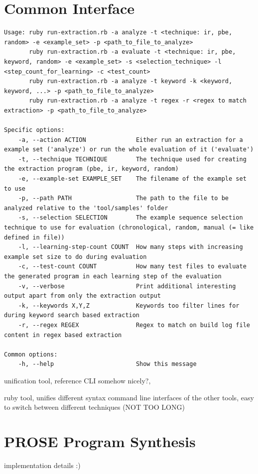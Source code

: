 \documentclass[\myrootdir/main.tex]{subfiles}
\begin{document}
\section{Common Interface}
\begin{lstlisting}
Usage: ruby run-extraction.rb -a analyze -t <technique: ir, pbe, random> -e <example_set> -p <path_to_file_to_analyze>
       ruby run-extraction.rb -a evaluate -t <technique: ir, pbe, keyword, random> -e <example_set> -s <selection_technique> -l <step_count_for_learning> -c <test_count>
       ruby run-extraction.rb -a analyze -t keyword -k <keyword, keyword, ...> -p <path_to_file_to_analyze>
       ruby run-extraction.rb -a analyze -t regex -r <regex to match extraction> -p <path_to_file_to_analyze>

Specific options:
    -a, --action ACTION              Either run an extraction for a example set ('analyze') or run the whole evaluation of it ('evaluate')
    -t, --technique TECHNIQUE        The technique used for creating the extraction program (pbe, ir, keyword, random)
    -e, --example-set EXAMPLE_SET    The filename of the example set to use
    -p, --path PATH                  The path to the file to be analyzed relative to the 'tool/samples' folder
    -s, --selection SELECTION        The example sequence selection technique to use for evaluation (chronological, random, manual (= like defined in file))
    -l, --learning-step-count COUNT  How many steps with increasing example set size to do during evaluation
    -c, --test-count COUNT           How many test files to evaluate the generated program in each learning step of the evaluation
    -v, --verbose                    Print additional interesting output apart from only the extraction output
    -k, --keywords X,Y,Z             Keywords too filter lines for during keyword search based extraction
    -r, --regex REGEX                Regex to match on build log file content in regex based extraction

Common options:
    -h, --help                       Show this message
\end{lstlisting}
unification tool, reference CLI somehow nicely?,

ruby tool, unifies different syntax command line interfaces of the other tools, easy to switch between different techniques (NOT TOO LONG)

\section{PROSE Program Synthesis}
implementation details :)
\end{document}
